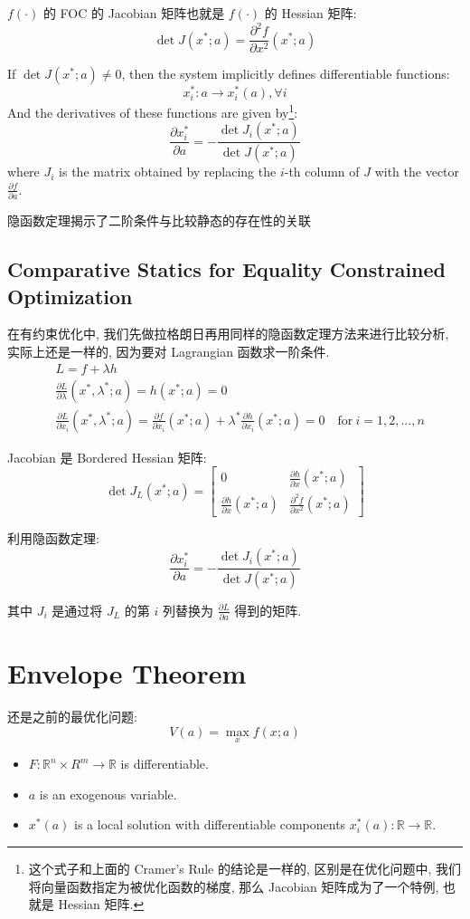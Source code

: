 $f(\cdot)$ 的 FOC 的 Jacobian 矩阵也就是 $f(\cdot)$ 的 Hessian 矩阵:
$$\det J(x^*;a) = \frac{\partial^2 f}{\partial x^2} (x^*;a)$$

\begin{proposition}
    If $\det J(x^*;a) \neq 0$, then the system implicitly defines differentiable functions:
    $$ x^*_i : a \to x^*_i(a) , \forall i$$
    And the derivatives of these functions are given by\footnote{这个式子和上面的 Cramer's Rule 的结论是一样的, 区别是在优化问题中, 我们将向量函数指定为被优化函数的梯度, 那么 Jacobian 矩阵成为了一个特例, 也就是 Hessian 矩阵.}:
    $$ \frac{\partial x^*_i}{\partial a} = -\frac{\det J_{i}(x^*;a)}{\det J(x^*;a)} $$
    where $J_{i}$ is the matrix obtained by replacing the $i$-th column of $J$ with the vector $\frac{\partial f}{\partial a}$.
\end{proposition}
\begin{note}
    隐函数定理揭示了二阶条件与比较静态的存在性的关联
\end{note}
\subsection{Comparative Statics for Equality Constrained Optimization}
在有约束优化中, 我们先做拉格朗日再用同样的隐函数定理方法来进行比较分析, 实际上还是一样的, 因为要对 Lagrangian 函数求一阶条件.
$$
\begin{aligned} &L = f + \lambda h \\&\frac{\partial L}{\partial\lambda}(x^*,\lambda^*;a)=h(x^*;a)=0\\&\frac{\partial L}{\partial x_i}(x^*,\lambda^*;a)=\frac{\partial f}{\partial x_i}(x^*;a)+\lambda^*\frac{\partial h}{\partial x_i}(x^*;a)=0\quad\mathrm{for~}i=1,2,...,n\end{aligned}
$$

Jacobian 是 Bordered Hessian 矩阵:
$$\det J_L(x^*;a) = \begin{bmatrix}
    0 & \frac{\partial h}{\partial x}(x^*;a) \\
    \frac{\partial h}{\partial x}(x^*;a) & \frac{\partial^2 f}{\partial x^2}(x^*;a)
\end{bmatrix} $$

利用隐函数定理:
$$ \frac{\partial x^*_i}{\partial a} = -\frac{\det J_{i}(x^*;a)}{\det J(x^*;a)} $$

其中 $J_{i}$ 是通过将 $J_L$ 的第 $i$ 列替换为 $\frac{\partial L}{\partial a}$ 得到的矩阵.
\section{Envelope Theorem}
还是之前的最优化问题:
$$ V(a) = \max_{x} f(x;a) $$
\begin{itemize}
    \item $F : \mathbb{R}^n \times R^m \to \mathbb{R}$ is differentiable.
    \item $a$ is an exogenous variable.
    \item $x^*(a)$ is a local solution with differentiable components $x^*_i(a) : \mathbb{R} \to \mathbb{R}$.
\end{itemize}

